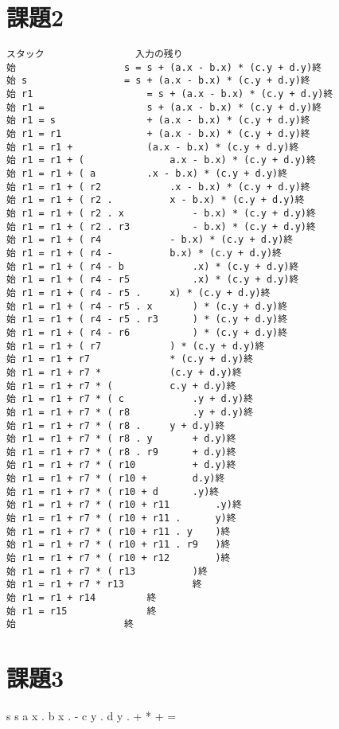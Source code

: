 \documentclass[a4paper,12pt]{jarticle}
\begin{document}
\section*{課題2}
\begin{comment}
課題1で代入文\\
s = s + (a.x - b.x) * (c.y + d.y)\\
を演算子順位法で構文解析する過程を、教科書の図4.1のようにスタックの動きをトレースする形で示せ。
\end{comment}
\fontsize{10pt}{0pt}\selectfont
\begin{lstlisting}[caption=構文解析の過程]
スタック				入力の残り
始					s = s + (a.x - b.x) * (c.y + d.y)終
始 s					= s + (a.x - b.x) * (c.y + d.y)終
始 r1 					= s + (a.x - b.x) * (c.y + d.y)終
始 r1 =					s + (a.x - b.x) * (c.y + d.y)終
始 r1 = s				+ (a.x - b.x) * (c.y + d.y)終
始 r1 = r1				+ (a.x - b.x) * (c.y + d.y)終
始 r1 = r1 +				(a.x - b.x) * (c.y + d.y)終
始 r1 = r1 + (				a.x - b.x) * (c.y + d.y)終
始 r1 = r1 + ( a			.x - b.x) * (c.y + d.y)終
始 r1 = r1 + ( r2			.x - b.x) * (c.y + d.y)終
始 r1 = r1 + ( r2 .			x - b.x) * (c.y + d.y)終
始 r1 = r1 + ( r2 . x			- b.x) * (c.y + d.y)終
始 r1 = r1 + ( r2 . r3			- b.x) * (c.y + d.y)終
始 r1 = r1 + ( r4			- b.x) * (c.y + d.y)終
始 r1 = r1 + ( r4 -			b.x) * (c.y + d.y)終
始 r1 = r1 + ( r4 - b			.x) * (c.y + d.y)終
始 r1 = r1 + ( r4 - r5			.x) * (c.y + d.y)終
始 r1 = r1 + ( r4 - r5 .		x) * (c.y + d.y)終
始 r1 = r1 + ( r4 - r5 . x		) * (c.y + d.y)終
始 r1 = r1 + ( r4 - r5 . r3		) * (c.y + d.y)終
始 r1 = r1 + ( r4 - r6			) * (c.y + d.y)終
始 r1 = r1 + ( r7			) * (c.y + d.y)終
始 r1 = r1 + r7				* (c.y + d.y)終
始 r1 = r1 + r7 *			(c.y + d.y)終
始 r1 = r1 + r7 * (			c.y + d.y)終
始 r1 = r1 + r7 * ( c			.y + d.y)終
始 r1 = r1 + r7 * ( r8			.y + d.y)終
始 r1 = r1 + r7 * ( r8 .		y + d.y)終
始 r1 = r1 + r7 * ( r8 . y		+ d.y)終
始 r1 = r1 + r7 * ( r8 . r9		+ d.y)終
始 r1 = r1 + r7 * ( r10			+ d.y)終
始 r1 = r1 + r7 * ( r10 +		d.y)終
始 r1 = r1 + r7 * ( r10 + d		.y)終
始 r1 = r1 + r7 * ( r10 + r11		.y)終
始 r1 = r1 + r7 * ( r10 + r11 .		y)終
始 r1 = r1 + r7 * ( r10 + r11 . y	)終
始 r1 = r1 + r7 * ( r10 + r11 . r9	)終
始 r1 = r1 + r7 * ( r10 + r12		)終
始 r1 = r1 + r7 * ( r13			)終
始 r1 = r1 + r7 * r13			終
始 r1 = r1 + r14			終
始 r1 = r15				終
始					終

\end{lstlisting}
\fontsize{12pt}{0pt}\selectfont
\section*{課題3}
\begin{comment}
課題2の代入文をポーランド記法(逆ポーランド記法)で表現せよ。
\end{comment}
s s a x . b x . - c y . d y . + * + =
\end{document}
